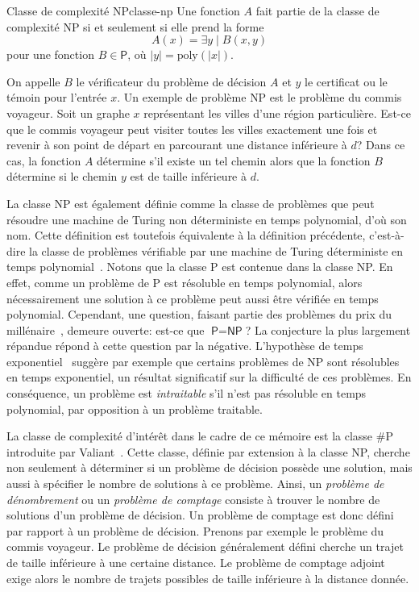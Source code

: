 \begin{maindefinition}{Classe de complexité \textsf{NP}}{classe-np}
    Une fonction $A$ fait partie de la classe de complexité \textsf{NP} si et seulement si elle prend la forme
    \begin{equation*}
        A(x) = \exists y \mid B(x,y)
    \end{equation*}
    pour une fonction $B \in  \textsf{P}$, où $\lvert y \rvert = \mathrm{poly}(\lvert x \rvert)$.
\end{maindefinition}

On appelle $B$ le vérificateur du problème de décision $A$ et $y$ le certificat ou le témoin pour l'entrée $x$. Un exemple de problème \textsf{NP} est le problème du commis voyageur. Soit un graphe $x$ représentant les villes d'une région particulière. Est-ce que le commis voyageur peut visiter toutes les villes exactement une fois et revenir à son point de départ en parcourant une distance inférieure à $d$? Dans ce cas, la fonction $A$ détermine s'il existe un tel chemin alors que la fonction $B$ détermine si le chemin $y$ est de taille inférieure à $d$.

La classe \textsf{NP} est également définie comme la classe de problèmes que peut résoudre une machine de Turing non déterministe en temps polynomial, d'où son nom. Cette définition est toutefois équivalente à la définition précédente, c'est-à-dire la classe de problèmes vérifiable par une machine de Turing déterministe en temps polynomial~\cite{sipserIntroductionTheoryComputation1996}. Notons que la classe \textsf{P} est contenue dans la classe \textsf{NP}. En effet, comme un problème de \textsf{P} est résoluble en temps polynomial, alors nécessairement une solution à ce problème peut aussi être vérifiée en temps polynomial. Cependant, une question, faisant partie des problèmes du prix du millénaire~\cite{carlsonMillenniumPrizeProblems2006}, demeure ouverte: est-ce que $\textsf{P} = \textsf{NP}$? La conjecture la plus largement répandue répond à cette question par la négative. L'hypothèse de temps exponentiel~\cite{impagliazzoComplexityKSAT2001} suggère par exemple que certains problèmes de \textsf{NP} sont résolubles en temps exponentiel, un résultat significatif sur la difficulté de ces problèmes. En conséquence, un problème est \textit{intraitable} s'il n'est pas résoluble en temps polynomial, par opposition à un problème traitable. 

La classe de complexité d'intérêt dans le cadre de ce mémoire est la classe \textsf{\#P} introduite par Valiant~\cite{valiantComplexityComputingPermanent1979}. Cette classe, définie par extension à la classe \textsf{NP}, cherche non seulement à déterminer si un problème de décision possède une solution, mais aussi à spécifier le nombre de solutions à ce problème. Ainsi, un \textit{problème de dénombrement} ou un \textit{problème de comptage} consiste à trouver le nombre de solutions d'un problème de décision. Un problème de comptage est donc défini par rapport à un problème de décision. Prenons par exemple le problème du commis voyageur. Le problème de décision généralement défini cherche un trajet de taille inférieure à une certaine distance. Le problème de comptage adjoint exige alors le nombre de trajets possibles de taille inférieure à la distance donnée. 

